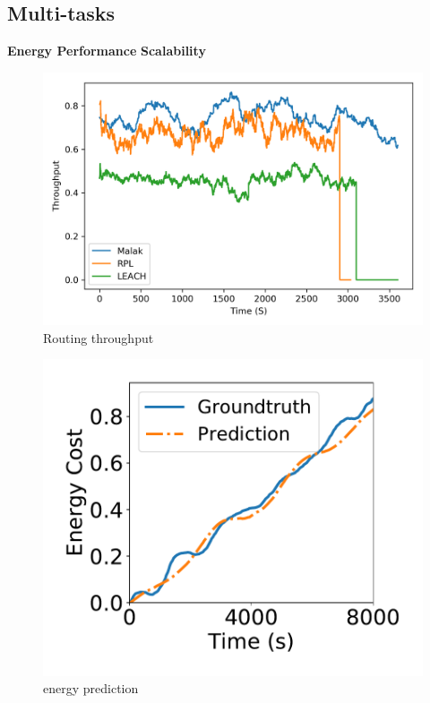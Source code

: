 \subsection{Multi-tasks}
\textbf{Energy Performance}
\textbf{Scalability}
\begin{figure}[htbp]
	\centering
	\includegraphics[width=.85\columnwidth]{Figure/throughput}
	\vspace{-0.1in}
	\caption{Routing throughput}
	\label{throughput}
	\vspace{-0.2in}
\end{figure}
\begin{figure}[htbp]
	\centering
	\includegraphics[width=.85\columnwidth]{Figure/energy_pred}
	\vspace{-0.1in}
	\caption{energy prediction}
	\label{energy_pred}
	\vspace{-0.2in}
\end{figure}
